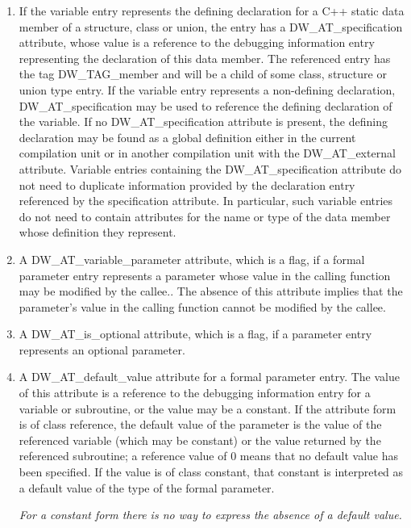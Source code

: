 \begin{enumerate}[1.]
\item If the variable entry represents the defining declaration
for a C++ static data member of a structure, class or union,
the entry has a DW\_AT\_specification attribute, whose value is a
reference to the debugging information entry representing the
declaration of this data member. The referenced entry has the
tag DW\_TAG\_member and will be a child of some class, structure
or union type entry.  If the variable entry represents a
non-defining declaration, DW\_AT\_specification may be used
to reference the defining declaration of the variable. If
no DW\_AT\_specification attribute is present, the defining
declaration may be found as a global definition either in the
current compilation unit or in another compilation unit with
the DW\_AT\_external attribute.  Variable entries containing
the DW\_AT\_specification attribute do not need to duplicate
information provided by the declaration entry referenced by
the specification attribute. In particular, such variable
entries do not need to contain attributes for the name or
type of the data member whose definition they represent.

\item A DW\_AT\_variable\_parameter attribute, which is a flag,
if a formal parameter entry represents a parameter whose
value in the calling function may be modified by the callee..
The absence of this attribute implies that the parameter’s
value in the calling function cannot be modified by the callee.

\item A DW\_AT\_is\_optional attribute, which is a flag, if a
parameter entry represents an optional parameter.

\item A DW\_AT\_default\_value attribute for a formal parameter
entry. The value of this attribute is a reference to the
debugging information entry for a variable or subroutine,
or the value may be a constant. If the attribute form is of
class reference, the default value of the parameter is the
value of the referenced variable (which may be constant) or
the value returned by the referenced subroutine; a reference
value of 0 means that no default value has been specified.
If the value is of class constant, that constant is interpreted
as a default value of the type of the formal parameter.

\textit{For a constant form there is no way to 
express the absence of a default value.}


\end{enumerate}
